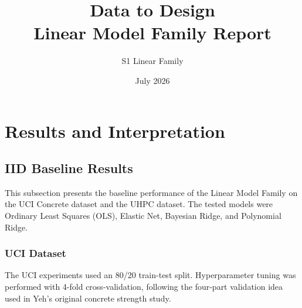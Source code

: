 \documentclass{article}
\title{\textbf{ Data to Design} \\ \large Linear Model Family Report}
\author{S1 Linear Family}
\date{July 2026}
\begin{document}
\maketitle
\tableofcontents
\clearpage

\section{Results and Interpretation}

\subsection{IID Baseline Results}
This subsection presents the baseline performance of the Linear Model Family on the UCI Concrete dataset and the UHPC dataset. The tested models were Ordinary Least Squares (OLS), Elastic Net, Bayesian Ridge, and Polynomial Ridge.

\subsubsection{UCI Dataset}

The UCI experiments used an 80/20 train-test split. Hyperparameter tuning was performed with 4-fold cross-validation, following the four-part validation idea used in Yeh's original concrete strength study.
\end{document}
